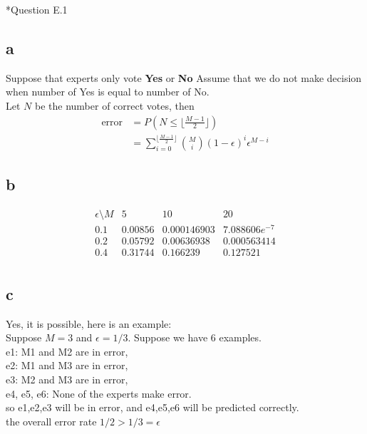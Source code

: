 \documentclass[12pt]{amsart}
\makeatletter
\renewcommand{\section}{\@startsection{section}{1}{0mm}
{-\baselineskip}{0.5\baselineskip}{\bf\leftline}}
\makeatother
\begin{document}
\section*{Question E.1}
\subsection*{a}
Suppose that experts only vote \textbf{Yes} or \textbf{No}
Assume that we do not make decision when number of Yes is equal to number of No.\\
Let $N$ be the number of correct votes, then
\begin{align*}
\mbox{error} &= P(N \leq \lfloor \frac{M-1}{2}\rfloor)\\
             &= \sum_{i=0}^{\lfloor \frac{M-1}{2}\rfloor}{{M}\choose{i}}(1-\epsilon)^i\epsilon^{M-i}
\end{align*}
\subsection*{b}
$$
\begin{array}{cccc}
\epsilon\setminus M    & 5   &  10      &  20\\
0.1   &0.00856 & 0.000146903 & 7.088606e^{-7} \\
0.2   &0.05792 & 0.00636938 & 0.000563414 \\
0.4   &0.31744 & 0.166239 & 0.127521 \\
\end{array}
$$
\subsection*{c}
Yes, it is possible, here is an example:\\
Suppose $M=3$ and $\epsilon = 1/3$. Suppose we have 6 examples. \\
e1: M1 and M2 are in error,\\
e2: M1 and M3 are in error, \\
e3: M2 and M3 are in error, \\
e4, e5, e6: None of the experts make error.\\
so e1,e2,e3 will be in error, and e4,e5,e6 will be predicted correctly.\\
the overall error rate $1/2 > 1/3 = \epsilon$
\end{document}
